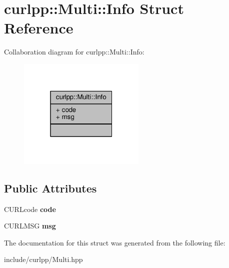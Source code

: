 \hypertarget{structcurlpp_1_1Multi_1_1Info}{\section{curlpp\-:\-:Multi\-:\-:Info Struct Reference}
\label{structcurlpp_1_1Multi_1_1Info}
}


Collaboration diagram for curlpp\-:\-:Multi\-:\-:Info\-:
\nopagebreak
\begin{figure}[H]
\begin{center}
\leavevmode
\includegraphics[width=172pt]{structcurlpp_1_1Multi_1_1Info__coll__graph}
\end{center}
\end{figure}
\subsection*{Public Attributes}
\begin{DoxyCompactItemize}
\item 
\hypertarget{structcurlpp_1_1Multi_1_1Info_a6ac2375e6150dd23ee4a8037699f815d}{C\-U\-R\-Lcode {\bfseries code}}\label{structcurlpp_1_1Multi_1_1Info_a6ac2375e6150dd23ee4a8037699f815d}

\item 
\hypertarget{structcurlpp_1_1Multi_1_1Info_ae15bbac2e293851e9d47751dda8725af}{C\-U\-R\-L\-M\-S\-G {\bfseries msg}}\label{structcurlpp_1_1Multi_1_1Info_ae15bbac2e293851e9d47751dda8725af}

\end{DoxyCompactItemize}


The documentation for this struct was generated from the following file\-:\begin{DoxyCompactItemize}
\item 
include/curlpp/Multi.\-hpp\end{DoxyCompactItemize}
